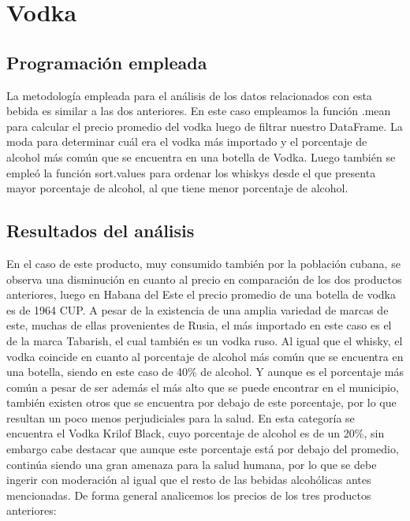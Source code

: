 \documentclass[a4paper,12pt]{article}
\begin{document}
	\section{Vodka}
		\subsection{Programación empleada}
		La metodología empleada para el análisis de los datos relacionados con esta bebida es similar a las dos anteriores. En este caso empleamos la función .mean para calcular el precio promedio del vodka luego de filtrar nuestro DataFrame. La moda para determinar cuál era el vodka más importado y el porcentaje de alcohol más común que se encuentra en una botella de Vodka. Luego también se empleó la función sort.values para ordenar los whiskys desde el que presenta mayor porcentaje de alcohol, al que tiene menor porcentaje de alcohol.
		
		\subsection{Resultados del análisis}
		En el caso de este producto, muy consumido también por la población cubana, se observa una disminución en cuanto al precio en comparación de los dos productos anteriores, luego en Habana del Este el precio promedio de una botella de vodka es de 1964 CUP. A pesar de la existencia de una amplia variedad de marcas de este, muchas de ellas provenientes de Rusia, el más importado en este caso es el de la marca Tabarish, el cual también es un vodka ruso. Al igual que el whisky, el vodka coincide en cuanto al porcentaje de alcohol más común que se encuentra en una botella, siendo en este caso de 40\% de alcohol. Y aunque es el porcentaje más común a pesar de ser además el más alto que se puede encontrar en el municipio, también existen otros que se encuentra por debajo de este porcentaje, por lo que resultan un poco menos perjudiciales para la salud. En esta categoría se encuentra el Vodka Krilof Black, cuyo porcentaje de alcohol es de un 20\%, sin embargo cabe destacar que aunque este porcentaje está por debajo del promedio, continúa siendo una gran amenaza para la salud humana, por lo que se debe ingerir con moderación al igual que el resto de las bebidas alcohólicas antes mencionadas. De forma general analicemos los precios de los tres productos anteriores:
		
\end{document}
